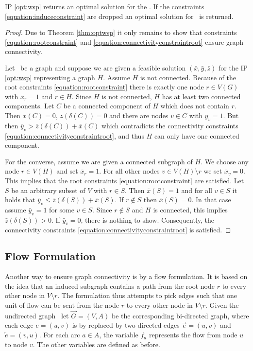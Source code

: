 \begin{lemma}
	\label{lemma:optwsproot}
	IP \eqref{opt:wsp} returns an optimal solution for the \WISP. If the constraints \eqref{equation:induceconstraint} are dropped an optimal solution for \WSP\ is returned.
\end{lemma}
\begin{proof}
	Due to Theorem \ref{thm:optwsp} it only remains to show that constraints \eqref{equation:rootconstraint} and \eqref{equation:connectivityconstraintroot} ensure graph connectivity.\medskip
	
	Let \ugraph\ be a graph and suppose we are given a feasible solution $(\bar{x}, \bar{y}, \bar{z})$ for the IP \eqref{opt:wsp} representing a graph $H$. Assume $H$ is not connected. Because of the root constraints \eqref{equation:rootconstraint} there is exactly one node $r \in V(G)$ with $\bar{x}_r = 1$ and $r \in H$. Since $H$ is not connected, $H$ has at least two connected components. Let $C$ be a connected component of $H$ which does not contain $r$. Then $\bar{x}(C) = 0$, $\bar{z}(\delta(C)) = 0$ and there are nodes $v \in C$ with $\bar{y}_v = 1$. But then $\bar{y}_v > \bar{z}(\delta(C)) + \bar{x}(C)$ which contradicts the connectivity constraints \eqref{equation:connectivityconstraintroot}, and thus $H$ can only have one connected component.\medskip
	
	For the converse, assume we are given a connected subgraph of $H$. We choose any node $r \in V(H)$ and set $\bar{x}_r = 1$. For all other nodes $v \in V(H) \setminus r$ we set $\bar{x}_v = 0$. This implies that the root constraints \eqref{equation:rootconstraint} are satisfied. Let $S$ be an arbitrary subset of $V$ with $r \in S$. Then $\bar{x}(S) = 1$ and for all $v \in S$ it holds that $\bar{y}_v \leq \bar{z}(\delta(S)) + \bar{x}(S)$. If $r \notin S$ then $\bar{x}(S) = 0$. In that case assume $\bar{y}_v = 1$ for some $v \in S$. Since $r \notin S$ and $H$ is connected, this implies $\bar{z}(\delta(S)) > 0$. If $\bar{y}_v = 0$, there is nothing to show. Consequently, the connectivity constraints \eqref{equation:connectivityconstraintroot} is satisfied.
\end{proof}


\subsection{Flow Formulation}
\label{sec:integer:wspflow}

Another way to ensure graph connectivity is by a flow formulation. It is based on the idea that an induced subgraph contains a path from the root node $r$ to every other node in $V \setminus r$. The formulation thus attempts to pick edges such that one unit of flow can be sent from the node $r$ to every other node in $V \setminus r$. Given the undirected graph \ugraph\ let $\overrightarrow{G} = (V, A)$ be the corresponding bi-directed graph, where each edge $e = (u, v)$ is by replaced by two directed edges $\overrightarrow{e} = (u,v)$ and $\overleftarrow{e} = (v,u)$. For each arc $a \in A$, the variable $f_a$ represents the flow from node $u$ to node $v$. The other variables are defined as before.\medskip

